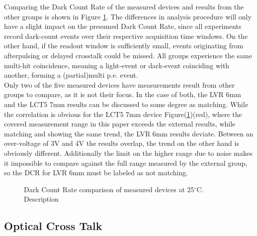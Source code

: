 \documentclass[12pt,article,type=msc,colorback,accentcolor=tud9c]{tudthesis}
\begin{document}
Comparing the Dark Count Rate of the measured devices and results from the other groups is shown in Figure \ref{fig:DC_DCR}. The differences in analysis procedure will only have a slight impact on the presumed Dark Count Rate, since all experiments record dark-count events over their respective acquisition time windows. On the other hand, if the readout window is sufficiently small, events originating from afterpulsing or delayed crosstalk could be missed. All groups experience the same multi-hit coincidence, meaning a light-event or dark-event coinciding with another, forming a (partial)multi p.e. event.\\
Only two of the five measured devices have measurements result from other groups to compare, as it is not their focus. In the case of both, the LVR 6mm and the LCT5 7mm results can be discussed to some degree as matching. While the correlation is obvious for the LCT5 7mm device Figure(\ref{fig:DC_DCR})(red), where the covered measurement range in this paper exceeds the  external results, while matching and showing the same trend, the LVR 6mm results deviate. Between an over-voltage of 3V and 4V the results overlap, the trend on the other hand is obviously different. Additionally the limit on the higher range due to noise makes it impossible to compare against the full range measured by the external group, so the DCR for LVR 6mm must be labeled as not matching. 

\begin{figure}%
\begin{centering}
\caption{Dark Count Rate comparison of measured devices at 25$^\circ$C. Description}
\label{fig:DC_DCR}
\end{centering}
\end{figure}

\subsection{Optical Cross Talk}
\label{subsec:DC_OCT}
\end{document}
